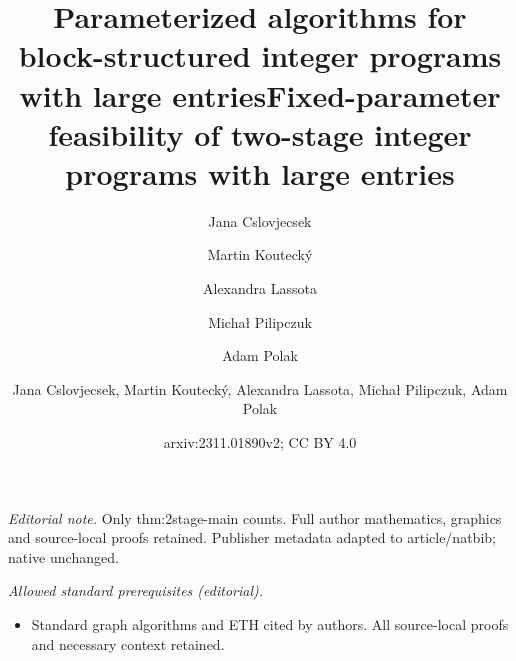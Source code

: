 \documentclass{article}
\author{Jana Cslovjecsek \and Martin Koutecký \and Alexandra Lassota \and Micha\l{} Pilipczuk \and Adam Polak}\date{}
\title{Parameterized algorithms for block-structured integer programs with large entries}
\title{Fixed-parameter feasibility of two-stage integer programs with large entries}
\author{Jana Cslovjecsek, Martin Koutecký, Alexandra Lassota, Michał Pilipczuk, Adam Polak}
\date{arxiv:2311.01890v2; CC BY 4.0}
\begin{document}
\maketitle
\noindent\textit{Editorial note.} Only thm:2stage-main counts. Full author mathematics, graphics and source-local proofs retained. Publisher metadata adapted to article/natbib; native unchanged.\par\medskip
\noindent\textit{Allowed standard prerequisites (editorial).}\begin{itemize}
\item Standard graph algorithms and ETH cited by authors. All source-local proofs and necessary context retained.
\end{itemize}\medskip
\maketitle

\end{document}
